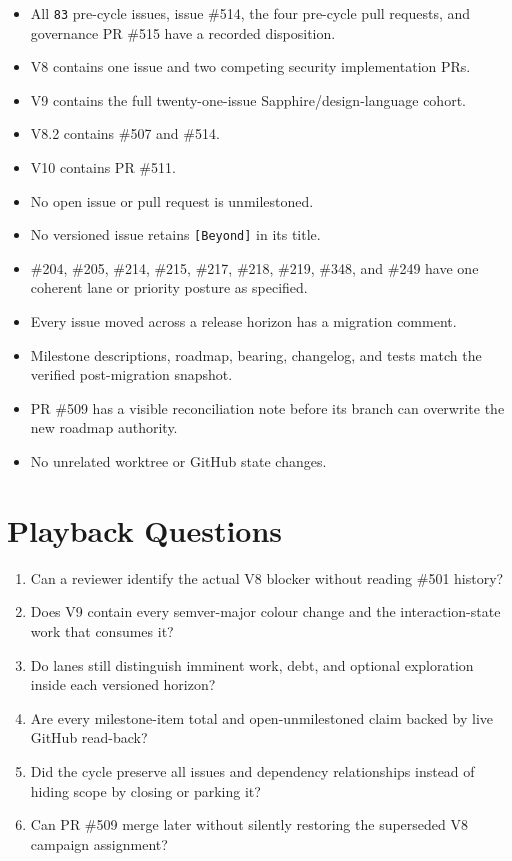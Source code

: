 \begin{itemize}
\tightlist
\item
  All \texttt{8\allowbreak{}3} pre-cycle issues, issue \#514, the four pre-cycle pull requests, and governance PR \#515 have a recorded disposition.
\item
  V8 contains one issue and two competing security implementation PRs.
\item
  V9 contains the full twenty-one-issue Sapphire/design-language cohort.
\item
  V8.2 contains \#507 and \#514.
\item
  V10 contains PR \#511.
\item
  No open issue or pull request is unmilestoned.
\item
  No versioned issue retains \texttt{[\allowbreak{}B\allowbreak{}e\allowbreak{}y\allowbreak{}o\allowbreak{}n\allowbreak{}d\allowbreak{}]} in its title.
\item
  \#204, \#205, \#214, \#215, \#217, \#218, \#219, \#348, and \#249 have one coherent lane or priority posture as specified.
\item
  Every issue moved across a release horizon has a migration comment.
\item
  Milestone descriptions, roadmap, bearing, changelog, and tests match the verified post-migration snapshot.
\item
  PR \#509 has a visible reconciliation note before its branch can overwrite the new roadmap authority.
\item
  No unrelated worktree or GitHub state changes.
\end{itemize}

\section{Playback Questions}\label{record-249-playback-questions}

\begin{enumerate}
\def\labelenumi{\arabic{enumi}.}
\tightlist
\item
  Can a reviewer identify the actual V8 blocker without reading \#501 history?
\item
  Does V9 contain every semver-major colour change and the interaction-state work that consumes it?
\item
  Do lanes still distinguish imminent work, debt, and optional exploration inside each versioned horizon?
\item
  Are every milestone-item total and open-unmilestoned claim backed by live GitHub read-back?
\item
  Did the cycle preserve all issues and dependency relationships instead of hiding scope by closing or parking it?
\item
  Can PR \#509 merge later without silently restoring the superseded V8 campaign assignment?
\end{enumerate}

